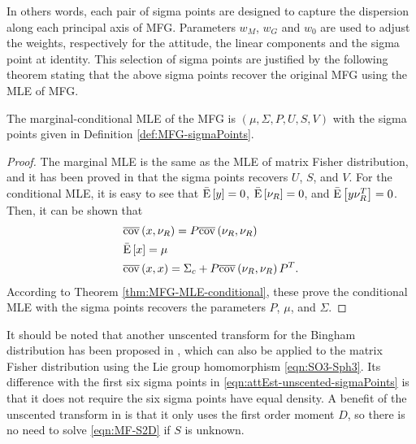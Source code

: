 In others words, each pair of sigma points are designed to capture the dispersion along each principal axis of MFG.
Parameters $w_M$, $w_G$ and $w_0$ are used to adjust the weights, respectively for the attitude, the linear components and the sigma point at identity.
This selection of sigma points are justified by the following theorem stating that the above sigma points recover the original MFG using the MLE of MFG.
\begin{theorem}
	The marginal-conditional MLE of the MFG is $(\mu,\Sigma,P,U,S,V)$ with the sigma points given in Definition \ref{def:MFG-sigmaPoints}.
\end{theorem}
\begin{proof}
	The marginal MLE is the same as the MLE of matrix Fisher distribution, and it has been proved in \cite[Theorem IV.1]{lee2018bayesian} that the sigma points recovers $U$, $S$, and $V$.
	For the conditional MLE, it is easy to see that $\bar{\mathrm{E}}\left[ y \right]=0$, $\bar{\mathrm{E}}\left[ \nu_R \right]=0$, and $\bar{\mathrm{E}}\left[ y\nu_R^T \right]=0$.
	Then, it can be shown that
	\begin{align*}
		&\overline{\mathrm{cov}}\left( x, \nu_R \right) = P\overline{\mathrm{cov}}\left( \nu_R, \nu_R \right) \\
		&\bar{\mathrm{E}}\left[ x \right] = \mu \\
		&\overline{\mathrm{cov}}\left( x, x \right) = \Sigma_c + P\overline{\mathrm{cov}}\left( \nu_R, \nu_R \right)P^T.
	\end{align*}
	According to Theorem \ref{thm:MFG-MLE-conditional}, these prove the conditional MLE with the sigma points recovers the parameters $P$, $\mu$, and $\Sigma$.
\end{proof}

It should be noted that another unscented transform for the Bingham distribution has been proposed in \cite{gilitschenski2015unscented}, which can also be applied to the matrix Fisher distribution using the Lie group homomorphism \eqref{eqn:SO3-Sph3}.
Its difference with the first six sigma points in \eqref{eqn:attEst-unscented-sigmaPoints} is that it does not require the six sigma points have equal density.
A benefit of the unscented transform in \cite{gilitschenski2015unscented} is that it only uses the first order moment $D$, so there is no need to solve \eqref{eqn:MF-S2D} if $S$ is unknown.

